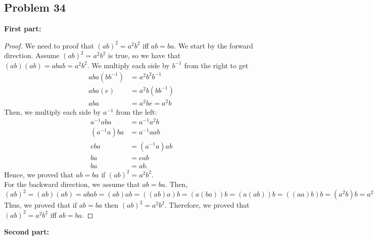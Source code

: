 \documentclass[a4paper,12pt]{article}
\begin{document}
\subsection*{Problem 34}
\textbf{First part:}
\begin{proof}
    We need to proof that $(ab)^2=a^2b^2$ iff $ab=ba.$ We start by the forward direction. Assume $(ab)^2=a^2b^2$ is true, so we have that $(ab)(ab)=abab=a^2b^2.$ We multiply each side by $b^{-1}$ from the right to get \begin{align*}aba(bb^{-1})&=a^2b^2b^{-1}\\aba(e)&=a^2b(bb^{-1})\\aba&=a^2be=a^2b\end{align*}
    Then, we multiply each side by $a^{-1}$ from the left:
    \begin{align*}
        a^{-1}aba &=a^{-1}a^2b\\
        (a^{-1}a)ba &=a^{-1}aab\\
        eba &= (a^{-1}a)ab\\
        ba &= eab\\
        ba &= ab.
    \end{align*}
    Hence, we proved that $ab=ba$ if $(ab)^2=a^2b^2$.\\
    For the backward direction, we assume that $ab=ba$. Then, $(ab)^2=(ab)(ab)=abab=(ab)ab=((ab)a)b=(a(ba))b=(a(ab))b=((aa)b)b=(a^2b)b=a^2bb=a^2b^2.$ Thus, we proved that if $ab=ba$ then $(ab)^2=a^2b^2.$ Therefore, we proved that $(ab)^2=a^2b^2$ iff $ab=ba.$
\end{proof}
\textbf{Second part:}
\end{document}
